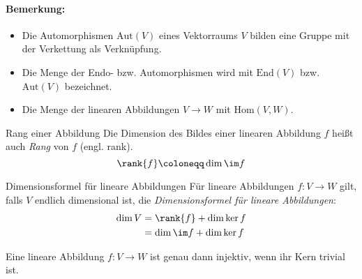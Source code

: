 \paragraph{Bemerkung:}
\begin{itemize}
	\item Die Automorphismen $\mathrm{Aut}(V)$ eines Vektorraums $V$ bilden eine Gruppe mit der Verkettung als Verknüpfung.
	\item Die Menge der Endo- bzw. Automorphismen wird mit $\mathrm{End}(V)$ bzw. $\mathrm{Aut}(V)$ bezeichnet.
	\item Die Menge der linearen Abbildungen $V\rightarrow W$ mit $\mathrm{Hom}(V,W)$.
\end{itemize}


\begin{definition}{Rang einer Abbildung}
  Die Dimension des Bildes einer linearen Abbildung $f$ heißt auch \emph{Rang} von $f$ (engl. rank).
  \begin{equation*}
    \rank{f} \coloneqq \dim{\im f}
  \end{equation*}
\end{definition}

\begin{satz}{Dimensionsformel für lineare Abbildungen}
  Für lineare Abbildungen $f:V\rightarrow W$ gilt, falls $V$ endlich dimensional ist, die \emph{Dimensionsformel für lineare Abbildungen}:
  \begin{align*}
    \dim{V}&=\rank{f}+\dim{\ker f}\\
    &=\dim{\im f}+\dim{\ker f}
  \end{align*}
\end{satz}

\begin{lemma}{}
  Eine lineare Abbildung $f:V\rightarrow W$ ist genau dann injektiv, wenn ihr Kern trivial ist.
\end{lemma}
